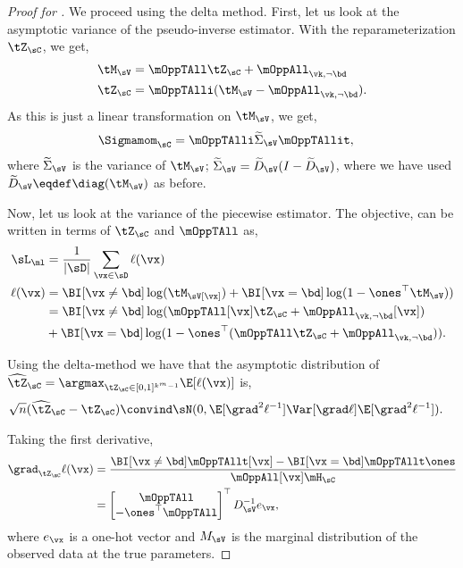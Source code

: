 \begin{proof}[Proof for ]
  We proceed using the delta method. First, let us look at the
  asymptotic variance of the pseudo-inverse estimator. With the
  reparameterization $\tZ_\sC$, we get,
  \begin{align*}
    \tM_\sV &= \mOppTAll \tZ_\sC + \mOppAll_{\vk,\neg \bd} \\
    \tZ_\sC &= \mOppTAlli (\tM_\sV - \mOppAll_{\vk, \neg \bd}).
  \end{align*}
  As this is just a linear transformation on $\tM_\sV$, we get,
  \begin{align*}
      \Sigmamom_{\sC} &= \mOppTAlli \widetilde\Sigma_\sV \mOppTAllit,
  \end{align*}
  where $\widetilde\Sigma_\sV$ is the variance of $\tM_\sV$; $\widetilde\Sigma_\sV = \widetilde{D}_\sV
  (I - \widetilde{D}_\sV)$, where we have used $\widetilde D_\sV \eqdef \diag(\tM_\sV)$ as
  before.

  Now, let us look at the variance of the piecewise estimator.  The
  objective,  can be written in terms of
  $\tZ_\sC$ and $\mOppTAll$ as,
  \begin{align*}
    \sL_\ml &= \frac{1}{|\sD|} \sum_{\vx \in \sD} \ell(\vx) \\
    \ell(\vx) &= \BI[\vx \neq \bd] \log(\tM_\sV[\vx]) + \BI[\vx = \bd] \log(1 - \ones^\top \tM_\sV) ) \\
              &= \BI[\vx \neq \bd] \log(\mOppTAll[\vx] \tZ_\sC + \mOppAll_{\vk, \neg \bd}[\vx]) \\
              &+ \BI[\vx = \bd] \log(1 - \ones^\top (\mOppTAll \tZ_\sC + \mOppAll_{\vk, \neg \bd})).
  \end{align*}

Using the delta-method \cite{vaart98asymptotic} we have that the asymptotic distribution of 
  $\widehat{{\tZ}}_\sC = \argmax_{\tZ_\sC \in [0,1]^{k^m-1}} \E[\ell(\vx)]$ is,
  \begin{align*}
    \sqrt{n}(\widehat{{\tZ}}_{\sC} - {\tZ}_{\sC}) 
      &\convind \sN( 0, \E[\grad^2 \ell^{-1}] \Var[\grad \ell] \E[\grad^2 \ell^{-1}]).
  \end{align*}

Taking the first derivative,
\begin{align}
  \grad_{\tZ_\sC} \ell(\vx)
  &= 
  \frac{\BI[\vx \neq \bd] \mOppTAllt[\vx] - \BI[\vx = \bd] \mOppTAllt \ones}{\mOppAll[\vx] \mH_\sC} 
  \nonumber \\ 
  &= 
  \begin{bmatrix}
    \mOppTAll \\
    -\ones^\top \mOppTAll
  \end{bmatrix}^\top
  D_{\sV}^{-1} e_\vx, \label{eqn:lhood-grad}
\end{align}
where $e_\vx$ is a one-hot vector and $M_\sV$ is the marginal
distribution of the observed data at the true parameters.


\end{proof}
